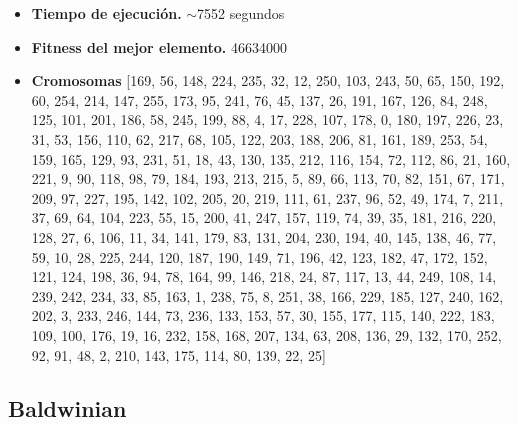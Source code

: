 \begin{itemize}
	\item \textbf{Tiempo de ejecución.} $\sim$7552 segundos
	\item \textbf{Fitness del mejor elemento.} 46634000
	\item \textbf{Cromosomas} [169, 56, 148, 224, 235, 32, 12, 250, 103, 243, 50, 65, 150, 192, 60, 254, 214, 147, 255, 173, 95, 241, 76, 45, 137, 26, 191, 167, 126, 84, 248, 125, 101, 201, 186, 58, 245, 199, 88, 4, 17, 228, 107, 178, 0, 180, 197, 226, 23, 31, 53, 156, 110, 62, 217, 68, 105, 122, 203, 188, 206, 81, 161, 189, 253, 54, 159, 165, 129, 93, 231, 51, 18, 43, 130, 135, 212, 116, 154, 72, 112, 86, 21, 160, 221, 9, 90, 118, 98, 79, 184, 193, 213, 215, 5, 89, 66, 113, 70, 82, 151, 67, 171, 209, 97, 227, 195, 142, 102, 205, 20, 219, 111, 61, 237, 96, 52, 49, 174, 7, 211, 37, 69, 64, 104, 223, 55, 15, 200, 41, 247, 157, 119, 74, 39, 35, 181, 216, 220, 128, 27, 6, 106, 11, 34, 141, 179, 83, 131, 204, 230, 194, 40, 145, 138, 46, 77, 59, 10, 28, 225, 244, 120, 187, 190, 149, 71, 196, 42, 123, 182, 47, 172, 152, 121, 124, 198, 36, 94, 78, 164, 99, 146, 218, 24, 87, 117, 13, 44, 249, 108, 14, 239, 242, 234, 33, 85, 163, 1, 238, 75, 8, 251, 38, 166, 229, 185, 127, 240, 162, 202, 3, 233, 246, 144, 73, 236, 133, 153, 57, 30, 155, 177, 115, 140, 222, 183, 109, 100, 176, 19, 16, 232, 158, 168, 207, 134, 63, 208, 136, 29, 132, 170, 252, 92, 91, 48, 2, 210, 143, 175, 114, 80, 139, 22, 25]
\end{itemize}


\subsection*{Baldwinian}

